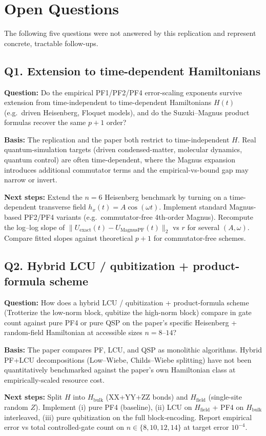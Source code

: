 \section{Open Questions}

The following five questions were not answered by this replication and
represent concrete, tractable follow-ups.

\subsection*{Q1. Extension to time-dependent Hamiltonians}
\textbf{Question:} Do the empirical PF1/PF2/PF4 error-scaling exponents
survive extension from time-independent to time-dependent Hamiltonians
$H(t)$ (e.g.\ driven Heisenberg, Floquet models), and do the
Suzuki--Magnus product formulas recover the same $p+1$ order?

\textbf{Basis:} The replication and the paper both restrict to
time-independent $H$. Real quantum-simulation targets (driven
condensed-matter, molecular dynamics, quantum control) are often
time-dependent, where the Magnus expansion introduces additional
commutator terms and the empirical-vs-bound gap may narrow or invert.

\textbf{Next steps:} Extend the $n=6$ Heisenberg benchmark by turning on
a time-dependent transverse field $h_x(t)=A\cos(\omega t)$. Implement
standard Magnus-based PF2/PF4 variants (e.g.\ commutator-free 4th-order
Magnus). Recompute the log--log slope of
$\|U_{\text{exact}}(t)-U_{\text{MagnusPF}}(t)\|_2$ vs $r$ for several
$(A,\omega)$. Compare fitted slopes against theoretical $p+1$ for
commutator-free schemes.

\subsection*{Q2. Hybrid LCU / qubitization + product-formula scheme}
\textbf{Question:} How does a hybrid LCU / qubitization + product-formula
scheme (Trotterize the low-norm block, qubitize the high-norm block)
compare in gate count against pure PF4 or pure QSP on the paper's
specific Heisenberg + random-field Hamiltonian at accessible sizes
$n=8$--$14$?

\textbf{Basis:} The paper compares PF, LCU, and QSP as monolithic
algorithms. Hybrid PF+LCU decompositions (Low--Wiebe, Childs--Wiebe
splitting) have not been quantitatively benchmarked against the paper's
own Hamiltonian class at empirically-scaled resource cost.

\textbf{Next steps:} Split $H$ into $H_{\text{bulk}}$ (XX+YY+ZZ bonds)
and $H_{\text{field}}$ (single-site random $Z$). Implement (i) pure PF4
(baseline), (ii) LCU on $H_{\text{field}}$ + PF4 on $H_{\text{bulk}}$
interleaved, (iii) pure qubitization on the full block-encoding. Report
empirical error vs total controlled-gate count on $n\in\{8,10,12,14\}$
at target error $10^{-4}$.

